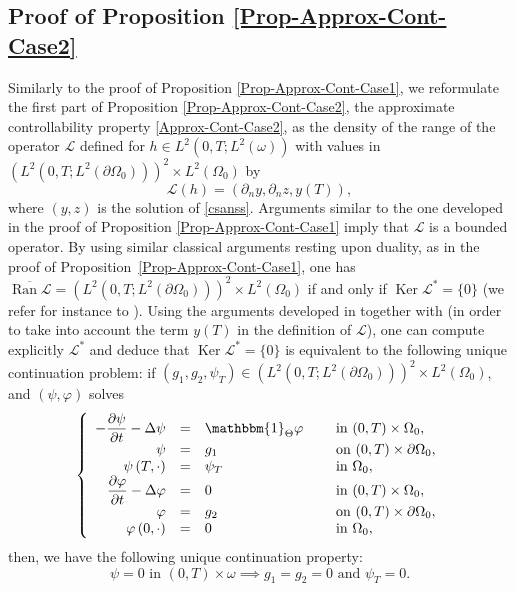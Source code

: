 \documentclass[10pt,a4paper]{amsart}
\DeclareMathOperator{\Ker}{Ker}
\DeclareMathOperator{\Ran}{Ran}
\theoremstyle{definition}
\begin{document}
\subsection{Proof of Proposition \ref{Prop-Approx-Cont-Case2}}\label{Subsec-Proof-ApproxCont-Case2}

Similarly to the proof of Proposition \ref{Prop-Approx-Cont-Case1}, we reformulate the first part of Proposition \ref{Prop-Approx-Cont-Case2}, \ie the approximate controllability property \eqref{Approx-Cont-Case2}, as the density of the range of the operator $\mathcal{L}$ defined for $h \in L^2(0,T; L^2(\omega))$ with values in $(L^2(0,T; L^2(\partial \Omega_0)))^2 \times L^2(\Omega_0)$ by
\[
\mathcal{L} (h) = (\partial_n y, \partial_n z, y(T)),
\]
where $(y,z)$ is the solution of \eqref{csanss}. Arguments similar to the one developed in the proof of Proposition \ref{Prop-Approx-Cont-Case1} imply that $\mathcal L$ is a bounded operator.
By using similar classical arguments resting upon duality, as in the proof of Proposition~\ref{Prop-Approx-Cont-Case1}, one has $\overline{\Ran \mathcal{L}} = (L^2(0,T; L^2(\partial \Omega_0)))^2 \times L^2(\Omega_0)$ if and only if $\Ker \mathcal{L}^* = \{0\}$ (we refer for instance to \cite[Cor.\,2.18]{Brezis}). Using the arguments developed in \cite[Prop.\,2.1]{Lissy-Privat-Simpore} together with \cite[Th.\,2.43, p.\,56]{CNL} (in order to take into account the term $y(T)$ in the definition of $\mathcal L$), one can compute explicitly $\mathcal L^*$ and deduce that $\Ker\mathcal{L}^* = \{0\}$ is equivalent to the following unique continuation problem: if $(g_1, g_2, \psi_T) \in (L^2(0,T; L^2(\partial\Omega_0)))^2\times L^2(\Omega_0)$, and $(\psi, \varphi)$ solves
\begin{equation}
\label{Coupled-Heat-Approx-Adj-Case2}
\left\{
\begin{array}{rcll}
- \dfrac{\partial \psi}{\partial t}-\Delta \psi &=&\mathbbm{1}_{\Theta}\varphi \quad&\text{ in }(0,T) \times \Omega_0,
\\
\psi &=& g_1 &\text{ on }(0,T) \times \partial \Omega_0,
\\
\psi \left(T,\cdot\right) &=& \psi_T &\text{ in }\Omega_0,
\\
\dfrac{\partial \varphi}{\partial t}-\Delta \varphi &=& 0 &\text{ in }(0,T) \times \Omega_0,
\\
\varphi &=& g_2 &\text{ on }(0,T) \times \partial \Omega_0,
\\
\varphi\left(0,\cdot\right) &=&0 &\text{ in }\Omega_0,
\end{array}
\right.
\end{equation}
then, we have the following unique continuation property:
\begin{equation}
\label{UC-Adj-Coupled-Case2}
\psi = 0 \text{ in } (0,T) \times \omega \implies g_1 =g_2 = 0 \text{ and } \psi_T = 0.
\end{equation}
\end{document}
